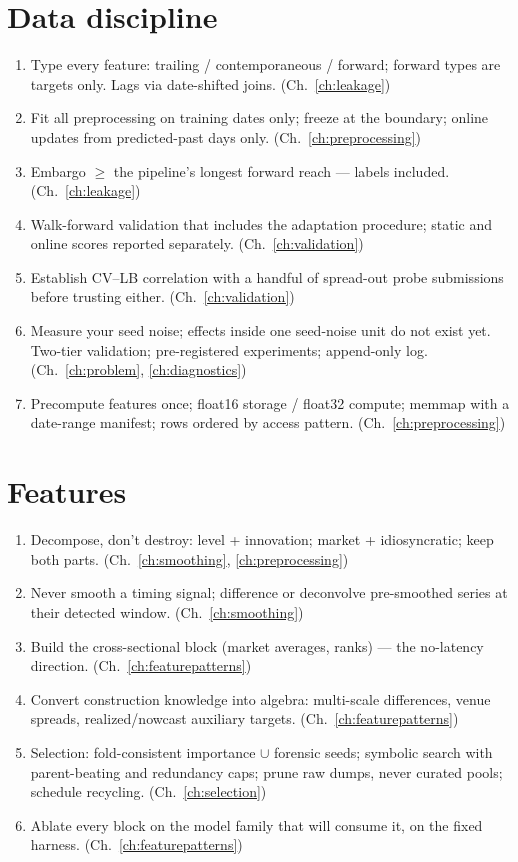 \section*{Data discipline}
\begin{enumerate}[label=\arabic*., itemsep=1pt, resume]
\item Type every feature: trailing / contemporaneous / forward; forward
  types are targets only. Lags via date-shifted joins.
  (Ch.~\ref{ch:leakage})
\item Fit all preprocessing on training dates only; freeze at the
  boundary; online updates from predicted-past days only.
  (Ch.~\ref{ch:preprocessing})
\item Embargo $\ge$ the pipeline's longest forward reach --- labels
  included. (Ch.~\ref{ch:leakage})
\item Walk-forward validation that includes the adaptation procedure;
  static and online scores reported separately.
  (Ch.~\ref{ch:validation})
\item Establish CV--LB correlation with a handful of spread-out probe
  submissions before trusting either. (Ch.~\ref{ch:validation})
\item Measure your seed noise; effects inside one seed-noise unit do not
  exist yet. Two-tier validation; pre-registered experiments;
  append-only log. (Ch.~\ref{ch:problem}, \ref{ch:diagnostics})
\item Precompute features once; float16 storage / float32 compute;
  memmap with a date-range manifest; rows ordered by access pattern.
  (Ch.~\ref{ch:preprocessing})
\end{enumerate}

\section*{Features}
\begin{enumerate}[label=\arabic*., itemsep=1pt, resume]
\item Decompose, don't destroy: level + innovation; market +
  idiosyncratic; keep both parts. (Ch.~\ref{ch:smoothing},
  \ref{ch:preprocessing})
\item Never smooth a timing signal; difference or deconvolve
  pre-smoothed series at their detected window.
  (Ch.~\ref{ch:smoothing})
\item Build the cross-sectional block (market averages, ranks) --- the
  no-latency direction. (Ch.~\ref{ch:featurepatterns})
\item Convert construction knowledge into algebra: multi-scale
  differences, venue spreads, realized/nowcast auxiliary targets.
  (Ch.~\ref{ch:featurepatterns})
\item Selection: fold-consistent importance $\cup$ forensic seeds;
  symbolic search with parent-beating and redundancy caps; prune raw
  dumps, never curated pools; schedule recycling.
  (Ch.~\ref{ch:selection})
\item Ablate every block on the model family that will consume it, on
  the fixed harness. (Ch.~\ref{ch:featurepatterns})
\end{enumerate}

